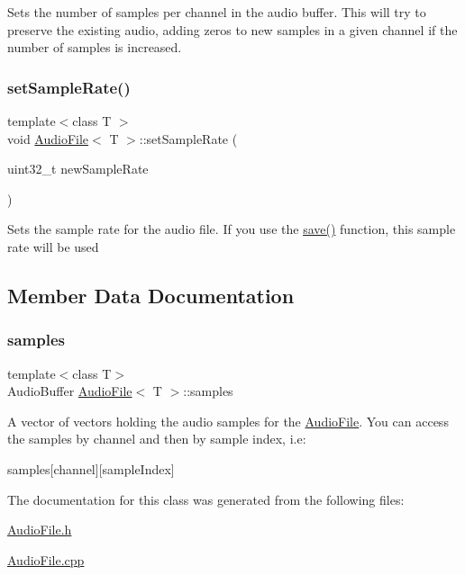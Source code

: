 Sets the number of samples per channel in the audio buffer. This will try to preserve the existing audio, adding zeros to new samples in a given channel if the number of samples is increased. \mbox{\label{class_audio_file_a2d8fa306e40535113c3eba111e16483b}} 
\subsubsection{\texorpdfstring{set\+Sample\+Rate()}{setSampleRate()}}
{\footnotesize\ttfamily template$<$class T $>$ \\
void \hyperlink{class_audio_file}{Audio\+File}$<$ T $>$\+::set\+Sample\+Rate (\begin{DoxyParamCaption}\item[{uint32\+\_\+t}]{new\+Sample\+Rate }\end{DoxyParamCaption})}

Sets the sample rate for the audio file. If you use the \hyperlink{class_audio_file_a415239cad5b54b4fef4a210ab79911e3}{save()} function, this sample rate will be used 

\subsection{Member Data Documentation}
\mbox{\label{class_audio_file_af937119db095c5af870851050dcbeabb}} 
\subsubsection{\texorpdfstring{samples}{samples}}
{\footnotesize\ttfamily template$<$class T$>$ \\
Audio\+Buffer \hyperlink{class_audio_file}{Audio\+File}$<$ T $>$\+::samples}

A vector of vectors holding the audio samples for the \hyperlink{class_audio_file}{Audio\+File}. You can access the samples by channel and then by sample index, i.\+e\+: \begin{DoxyVerb} samples[channel][sampleIndex]\end{DoxyVerb}
 

The documentation for this class was generated from the following files\+:\begin{DoxyCompactItemize}
\item 
\hyperlink{_audio_file_8h}{Audio\+File.\+h}\item 
\hyperlink{_audio_file_8cpp}{Audio\+File.\+cpp}\end{DoxyCompactItemize}
